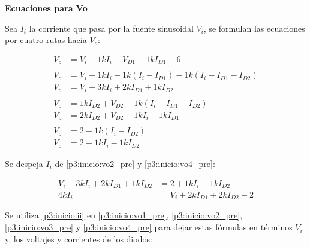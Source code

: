 %
%
%

\textbf{Ecuaciones para Vo}

Sea $I_i$ la corriente que pasa por la fuente sinusoidal $V_i$, se formulan las
ecuaciones por cuatro rutas hacia $V_o$:


\begin{align}
  V_o &= V_i - 1k I_i - V_{D1} - 1k I_{D1} - 6 \label{p3:inicio:vo1_pre}
  \\
  \nonumber \\
  V_o &= V_i - 1k I_i - 1k (I_i - I_{D1}) - 1k (I_i - I_{D1} - I_{D2}) \nonumber
  \\
  V_o &= V_i - 3k I_i + 2k I_{D1} + 1k I_{D2} \label{p3:inicio:vo2_pre}
  \\
  \nonumber \\
  V_o &= 1k I_{D2} + V_{D2} - 1k (I_i - I_{D1} - I_{D2}) \nonumber
  \\
  V_o &= 2k I_{D2} + V_{D2} - 1k I_i + 1k I_{D1} \label{p3:inicio:vo3_pre}
  \\
  \nonumber \\
  V_o &= 2 + 1k (I_i - I_{D2}) \nonumber
  \\
  V_o &= 2 + 1k I_i - 1k I_{D2} \label{p3:inicio:vo4_pre}
\end{align}

\newpage
Se despeja $I_i$ de \ref{p3:inicio:vo2_pre} y \ref{p3:inicio:vo4_pre}:

\begin{align}
  V_i - 3k I_i + 2k I_{D1} + 1k I_{D2} &= 2 + 1k I_i - 1k I_{D2} \nonumber
  \\
  4k I_i &= V_i + 2k I_{D1} + 2k I_{D2} - 2 \label{p3:inicio:ii}
\end{align}

Se utiliza \ref{p3:inicio:ii} en \ref{p3:inicio:vo1_pre},
\ref{p3:inicio:vo2_pre}, \ref{p3:inicio:vo3_pre} y \ref{p3:inicio:vo4_pre} para
dejar estas fórmulas en términos $V_i$ y, los voltajes y corrientes
de los diodos:

